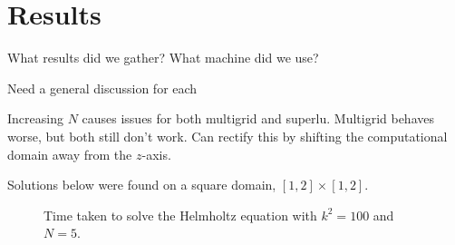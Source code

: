 \chapter{Results}

\def\figwidth{0.7\columnwidth}


What results did we gather?
What machine did we use?

Need a general discussion for each

Increasing $N$ causes issues for both multigrid and superlu.
Multigrid behaves worse, but both still don't work.
Can rectify this by shifting the computational domain away from the $z$-axis.


Solutions below were found on a square domain, $[1,2]\times [1,2]$.

\begin{figure}
    \centering

    \caption{Time taken to solve the Helmholtz equation with $k^2=100$ and $N=5$.}
\end{figure}






%
%    
%
%
%
%


